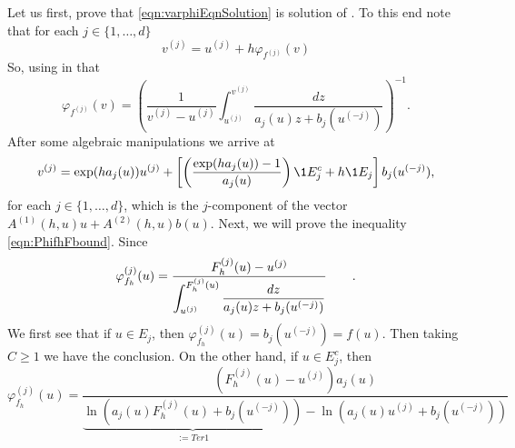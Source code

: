 \documentclass[sort&compress, preprint]{elsarticle}
\theoremstyle{definition}
\theoremstyle{plain}%
\theoremstyle{remark}
\newcommand{\SM}{LS\xspace}
\begin{document}
\begin{pf}
	Let us first, prove that \eqref{eqn:varphiEqnSolution} is solution of . To this end note 
	that for each $j\in \{1,\dots, d\}$
	\begin{equation*}
		v^{(j)} = u^{(j)} + h \varphi_{f^{(j)}}(v)	
	\end{equation*}
	So, using in   that
	\begin{equation}
		\varphi_{f^{(j)}}(v) =
			\left(
				\frac{1}{v^{(j)}-u^{(j)}}
				\int 
				_{u^{(j)}}^{v^{(j)}}
				\frac{dz}
				{
					a_{j}(u) z
					+b_{j}(u^{(-j)})
				}
				\right)^{-1}.
	\end{equation} 
	After some algebraic manipulations we arrive at
%	
	\begin{equation}
		v^{(j)}= \exp(h a_j(u)) u^{(j)} + 
		\left[
			\left(
				\frac{\exp(ha_j(u))-1}{a_j(u)}
			\right)
			\1{E_j^c}
			+h \1{E_j}
		\right]b_{j}(u^{(-j)}),
	\end{equation}	
	for each $j\in \{1,\dots, d\}$, which is the $j$-component of the vector
	$A^{(1)}(h,u)u +A^{(2)}(h,u) b(u)$.
	Next, we will prove the inequality \eqref{eqn:PhifhFbound}. Since 
	$$
		\varphi_{f_h}^{(j)}(u) = 
			\frac{
				F_h^{(j)}(u)-u^{(j)}
			}%
			{%
				\displaystyle
				\int_{u^{(j)}}^{F_h^{(j)}(u)}
				\frac{dz}{a_j(u)z + b_j(u^{(-j)})}
			} \qquad.
	$$
	We first see that if $u\in E_j$, then 
	$
		\varphi_{f_h}^{(j)}(u) = b_j(u^{(-j)}) = f(u).
	$
	Then taking $C\geq 1$ we have the conclusion.
	On the other hand, if $u\in E_j^c$, then
	\begin{equation}\label{eqn:VarPhiEjc}
		\varphi_{f_h}^{(j)}(u) =
		\frac{
				(F_h^{(j)}(u)-u^{(j)}) a_j(u)
			}
			{
				\underbrace{
				\ln \left(
					a_j(u) F_h^{(j)}(u) + b_j(u^{(-j)})
				\right)
				}_{:=Ter1}
				-
				\ln \left(
					a_j(u) u^{(j)} + b_j(u^{(-j)})
				\right)
			}		
	\end{equation}

\end{pf}
\end{document}
